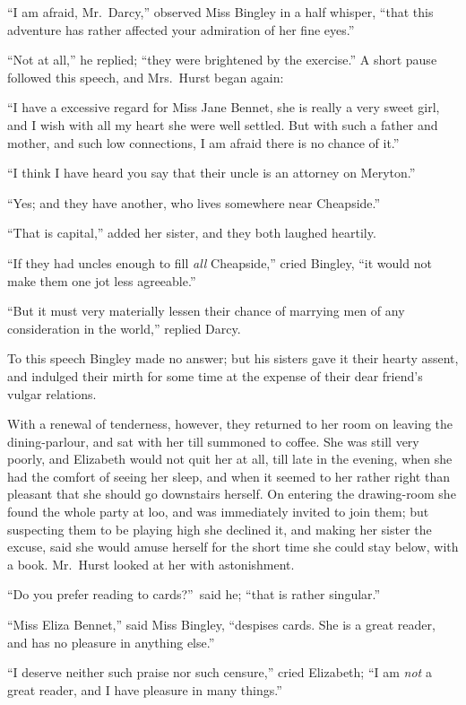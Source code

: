 \documentclass[12pt,english]{book}
\begin{document}
{}``I am afraid, Mr.\ Darcy,'' observed Miss Bingley in a half
whisper, {}``that this adventure has rather affected your admiration
of her fine eyes.''

{}``Not at all,'' he replied; {}``they were brightened by the exercise.''
A short pause followed this speech, and Mrs.\ Hurst began again:

{}``I have a excessive regard for Miss Jane Bennet, she is really
a very sweet girl, and I wish with all my heart she were well settled.
But with such a father and mother, and such low connections, I am
afraid there is no chance of it.''

{}``I think I have heard you say that their uncle is an attorney
on Meryton.''

{}``Yes; and they have another, who lives somewhere near Cheapside.''

{}``That is capital,'' added her sister, and they both laughed heartily.

{}``If they had uncles enough to fill \textit{all} Cheapside,''
cried Bingley, {}``it would not make them one jot less agreeable.''

{}``But it must very materially lessen their chance of marrying men
of any consideration in the world,'' replied Darcy.

To this speech Bingley made no answer; but his sisters gave it their
hearty assent, and indulged their mirth for some time at the expense
of their dear friend's vulgar relations.

With a renewal of tenderness, however, they returned to her room on
leaving the dining-parlour, and sat with her till summoned to coffee.
She was still very poorly, and Elizabeth would not quit her at all,
till late in the evening, when she had the comfort of seeing her sleep,
and when it seemed to her rather right than pleasant that she should
go downstairs herself. On entering the drawing-room she found the
whole party at loo, and was immediately invited to join them; but
suspecting them to be playing high she declined it, and making her
sister the excuse, said she would amuse herself for the short time
she could stay below, with a book. Mr.\ Hurst looked at her with
astonishment.

{}``Do you prefer reading to cards?''\ said he; {}``that is rather
singular.''

{}``Miss Eliza Bennet,'' said Miss Bingley, {}``despises cards.
She is a great reader, and has no pleasure in anything else.''

{}``I deserve neither such praise nor such censure,'' cried Elizabeth;
{}``I am \textit{not} a great reader, and I have pleasure in many
things.''
\end{document}
